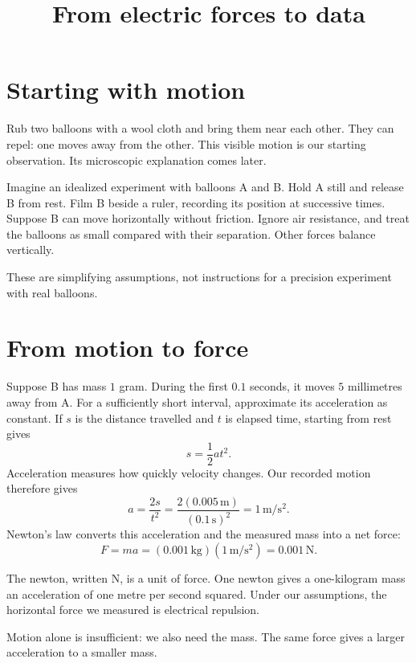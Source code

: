



\title{From electric forces to data}
\maketitle

\tableofcontents

\section{Starting with motion}

Rub two balloons with a wool cloth and
bring them near each other. They can
repel: one moves away from the other.
This visible motion is our starting
observation. Its microscopic explanation
comes later.

Imagine an idealized experiment with
balloons A and B. Hold A still and
release B from rest. Film B beside a
ruler, recording its position at
successive times. Suppose B can move
horizontally without friction. Ignore
air resistance, and treat the balloons
as small compared with their separation.
Other forces balance vertically.

These are simplifying assumptions,
not instructions for a precision
experiment with real balloons.

\section{From motion to force}

Suppose B has mass $1$ gram. During
the first $0.1$ seconds, it moves
$5$ millimetres away from A.
For a sufficiently short interval,
approximate its acceleration as constant.
If $s$ is the distance travelled and
$t$ is elapsed time, starting from rest
gives
$$
s=\frac12 at^2.
$$
Acceleration measures how quickly
velocity changes. Our recorded motion
therefore gives
$$
a=\frac{2s}{t^2}
=\frac{2(0.005\,\mathrm m)}
{(0.1\,\mathrm s)^2}
=1\,\mathrm{m/s^2}.
$$
Newton's law converts this acceleration
and the measured mass into a net force:
$$
F=ma
=(0.001\,\mathrm{kg})
(1\,\mathrm{m/s^2})
=0.001\,\mathrm N.
$$

The newton, written $\mathrm N$, is
a unit of force. One newton gives a
one-kilogram mass an acceleration of one
metre per second squared. Under our
assumptions, the horizontal force we
measured is electrical repulsion.

Motion alone is insufficient: we also
need the mass. The same force gives a
larger acceleration to a smaller mass.

